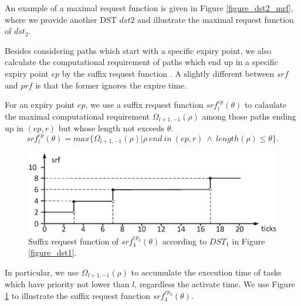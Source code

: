 \documentclass[sigconf]{acmart}
\begin{document}
An example of a maximal request function is given in Figure \ref{figure_dst2_mrf}, where we provide another DST $dst2$ and illustrate the maximal request function of $dst_2$.

Besides considering paths which start with a specific expiry point, we also calculate the computational requirement of paths which end up in a specific expiry point $ep$ by the suffix request function \cite{DBLP:journals/rts/Stigge015a}. A slightly different between $srf$ and $prf$ is that the former ignores the expire time.%

\begin{definition}
For an expiry point $ep$, we use a suffix request function $srf^{ep}_{l}(\theta)$ to calaulate the maximal computational requirement $\Omega_{l+1,-1}(\rho)$ among those paths ending up in $(ep,r)$ but whose length not exceeds $\theta$.
\begin{equation}
srf^{ep}_l(\theta)=max\{\Omega_{l+1,-1}(\rho)|\rho\ end\ in\ (ep,r)\ \wedge\ length(\rho)\leq \theta\}.
\end{equation}\label{equation_srf}
\end{definition}
\begin{figure}[t]
  \centering
  \includegraphics[scale=0.31]{graphics/figure_srf.eps}
  \caption{Suffix request function of $srf^{ep_3}_{4}(\theta)$ according to $DST_1$ in Figure \ref{figure_dst1}.} 
  \label{figure_srf}
\end{figure}

In particular, we use $\Omega_{l+1,-1}(\rho)$ to accumulate the execution time of tasks which have priority not lower than $l$, regardless the activate time. We use Figure \ref{figure_srf} to illustrate the suffix request function $srf^{ep_3}_{4}(\theta)$.

\end{document}
